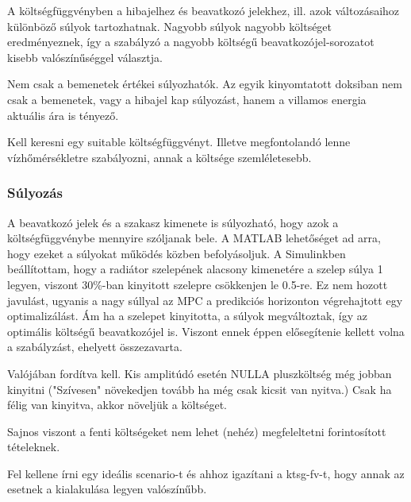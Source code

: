 A költségfüggvényben a hibajelhez és beavatkozó jelekhez, ill. azok változásaihoz különböző súlyok tartozhatnak.
Nagyobb súlyok nagyobb költséget eredményeznek, így a szabályzó a nagyobb költségű beavatkozójel-sorozatot kisebb valószínűséggel választja.






Nem csak a bemenetek értékei súlyozhatók. Az egyik kinyomtatott doksiban nem csak a bemenetek, vagy a hibajel kap súlyozást, hanem a villamos energia aktuális ára is tényező.

Kell keresni egy suitable költségfüggvényt. Illetve megfontolandó lenne vízhőmérsékletre szabályozni, annak a költsége szemléletesebb.

\subsubsection{Súlyozás}
A beavatkozó jelek és a szakasz kimenete is súlyozható, hogy azok a költségfüggvénybe mennyire szóljanak bele. A MATLAB lehetőséget ad arra, hogy ezeket a súlyokat működés közben befolyásoljuk. A Simulinkben beállítottam, hogy a radiátor szelepének alacsony kimenetére a szelep súlya 1 legyen, viszont 30\%-ban kinyitott szelepre csökkenjen le 0.5-re. Ez nem hozott javulást, ugyanis a nagy súllyal az MPC a predikciós horizonton végrehajtott egy optimalizálást. Ám ha a szelepet kinyitotta, a súlyok megváltoztak, így az optimális költségű beavatkozójel is. Viszont ennek éppen elősegítenie kellett volna a szabályzást, ehelyett összezavarta.


Valójában fordítva kell. Kis amplitúdó esetén NULLA pluszköltség még jobban kinyitni ("Szívesen" növekedjen tovább ha még csak kicsit van nyitva.) Csak ha félig van kinyitva, akkor növeljük a költséget.

Sajnos viszont a fenti költségeket nem lehet (nehéz) megfeleltetni forintosított tételeknek.

Fel kellene írni egy ideális scenario-t és ahhoz igazítani a ktsg-fv-t, hogy annak az esetnek a kialakulása legyen valószínűbb.

%
%
%

